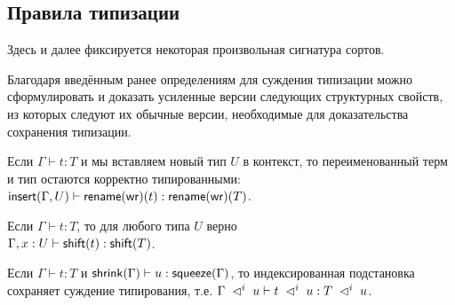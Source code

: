 \subsection{Правила типизации}

Здесь и далее фиксируется некоторая произвольная
сигнатура сортов.

\begin{definition}
\end{definition}

Благодаря введённым ранее определениям для суждения
типизации можно сформулировать и доказать усиленные
версии следующих структурных свойств, из которых
следуют их обычные версии, необходимые для
доказательства сохранения типизации.

\begin{lemma}
Если $\Gamma \vdash t : T$ и мы вставляем новый
тип $U$ в контекст, то переименованный терм
и тип остаются корректно типированными: \\
$\mathsf{insert}(\Gamma, U) \vdash \mathsf{rename}(\mathsf{wr})(t) : \mathsf{rename}(\mathsf{wr})(T)$.
\end{lemma}

\begin{lemma}[Ослабление]
Если $\Gamma \vdash t : T$, то для любого типа $U$
верно \\ $\Gamma,x:U \vdash \mathsf{shift}(t) : \mathsf{shift}(T)$.
\end{lemma}

\begin{lemma}
Если $\Gamma \vdash t : T$
и $\mathsf{shrink}(\Gamma) \vdash u : \mathsf{squeeze}(\Gamma)$,
то индексированная подстановка сохраняет суждение
типирования, т.е.
$\Gamma\;\vartriangleleft^i\;u\vdash t\;\vartriangleleft^i\;u:T\;\vartriangleleft^i\;u$.
\end{lemma}

